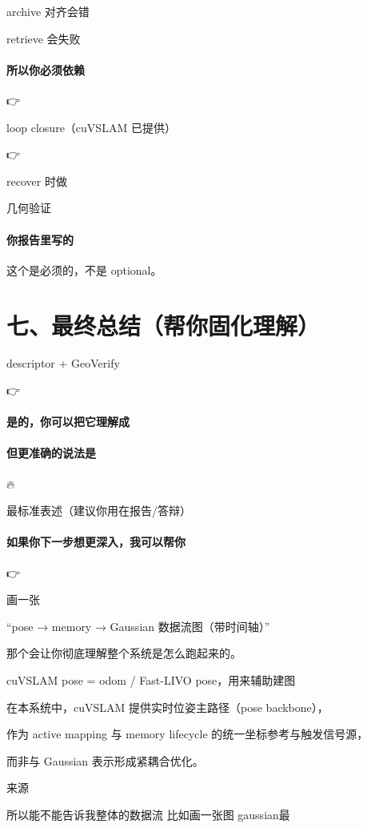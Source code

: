 \documentclass[12pt]{article}
\begin{document}
archive 对齐会错

retrieve 会失败

\paragraph{所以你必须依赖}
👉

loop closure（cuVSLAM 已提供）

👉

recover 时做

几何验证

\paragraph{你报告里写的}
这个是必须的，不是 optional。

\section{七、最终总结（帮你固化理解）}
descriptor + GeoVerify

👉

\paragraph{是的，你可以把它理解成}
\paragraph{但更准确的说法是}
🔥

最标准表述（建议你用在报告/答辩）

\paragraph{如果你下一步想更深入，我可以帮你}
👉

画一张

“pose → memory → Gaussian 数据流图（带时间轴）”

那个会让你彻底理解整个系统是怎么跑起来的。

cuVSLAM pose = odom / Fast-LIVO pose，用来辅助建图

在本系统中，cuVSLAM 提供实时位姿主路径（pose backbone），

作为 active mapping 与 memory lifecycle 的统一坐标参考与触发信号源，

而非与 Gaussian 表示形成紧耦合优化。

来源

所以能不能告诉我整体的数据流 比如画一张图 gaussian最
\end{document}
